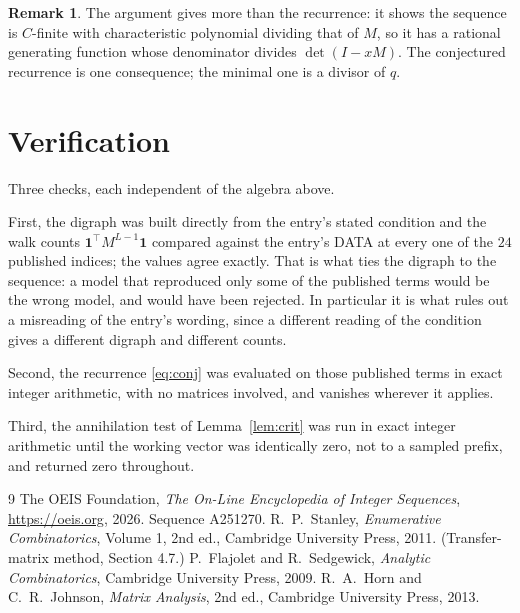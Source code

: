 \documentclass[11pt,a4paper]{article}
\theoremstyle{plain}
\theoremstyle{definition}
\newtheorem{remark}[theorem]{Remark}
\begin{document}
\begin{remark}
The argument gives more than the recurrence: it shows the sequence is $C$-finite with
characteristic polynomial dividing that of $M$, so it has a rational generating function
whose denominator divides $\det(I-xM)$. The conjectured recurrence is one consequence; the
minimal one is a divisor of $q$.
\end{remark}

\section{Verification}

Three checks, each independent of the algebra above.

First, the digraph was built directly from the entry's stated condition and the walk counts
$\mathbf{1}^{\!\top}M^{L-1}\mathbf{1}$ compared against the entry's DATA at
every one of the $24$ published indices; the values agree exactly. That is what ties
the digraph to the sequence: a model that reproduced only some of the published terms would
be the wrong model, and would have been rejected. In particular it is what rules out a
misreading of the entry's wording, since a different reading of the condition gives a
different digraph and different counts.

Second, the recurrence \eqref{eq:conj} was evaluated on those published terms in exact
integer arithmetic, with no matrices involved, and vanishes wherever it applies.

Third, the annihilation test of Lemma~\ref{lem:crit} was run in exact integer arithmetic
until the working vector was identically zero, not to a sampled prefix, and returned zero
throughout.

\begin{thebibliography}{9}
 The OEIS Foundation, \emph{The On-Line Encyclopedia of Integer
Sequences}, \url{https://oeis.org}, 2026. Sequence A251270.
 R.~P.~Stanley, \emph{Enumerative Combinatorics}, Volume 1, 2nd ed.,
Cambridge University Press, 2011. (Transfer-matrix method, Section 4.7.)
 P.~Flajolet and R.~Sedgewick, \emph{Analytic Combinatorics}, Cambridge
University Press, 2009.
 R.~A.~Horn and C.~R.~Johnson, \emph{Matrix Analysis}, 2nd ed., Cambridge
University Press, 2013.
\end{thebibliography}
\end{document}
